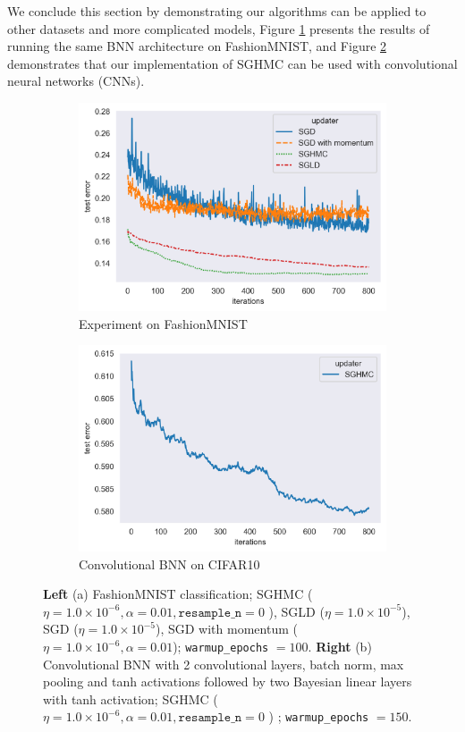 We conclude this section by demonstrating our algorithms can be applied to other datasets and more complicated models, Figure \ref{fig:fashionMNIST} presents the results of running the same BNN architecture on FashionMNIST, and Figure \ref{fig:CIFAR10} demonstrates that our implementation of SGHMC can be used with convolutional neural networks (CNNs).
\begin{figure}[h!]
\centering
\begin{subfigure}{.5\textwidth}
  \centering
  \includegraphics[width=.95\linewidth]{parts/Images/fashion-mnist.png}
  \caption{Experiment on FashionMNIST}
  \label{fig:fashionMNIST}
\end{subfigure}%
\begin{subfigure}{.5\textwidth}
  \centering
  \includegraphics[width=.95\linewidth]{parts/Images/CIFAR10.png}
  \caption{Convolutional BNN on CIFAR10}
  \label{fig:CIFAR10}
\end{subfigure}
\caption{{\bf Left} (a) FashionMNIST classification; SGHMC ($\eta = 1.0\times 10^{-6}, \alpha=0.01, \texttt{resample\_n} =0$ ), SGLD ($\eta = 1.0\times 10^{-5}$), SGD ($\eta = 1.0\times 10^{-5}$), SGD with momentum ($\eta = 1.0\times 10^{-6}, \alpha=0.01$); \texttt{warmup\_epochs} $= 100$. {\bf Right} (b) Convolutional BNN with 2 convolutional layers, batch norm, max pooling and tanh activations followed by two Bayesian linear layers with tanh activation;  SGHMC ($\eta = 1.0\times 10^{-6}, \alpha=0.01, \texttt{resample\_n} =0$ ) ; \texttt{warmup\_epochs} $= 150$.}
\label{fig:other-datasets}
\end{figure}